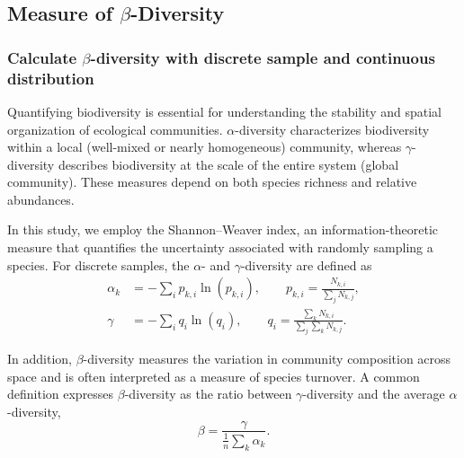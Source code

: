 \subsection{Measure of $\beta$-Diversity}

    \subsubsection*{Calculate $\beta$-diversity with discrete sample and continuous distribution}

    Quantifying biodiversity is essential for understanding the stability and spatial organization of ecological communities. $\alpha$-diversity characterizes biodiversity within a local (well-mixed or nearly homogeneous) community, whereas $\gamma$-diversity describes biodiversity at the scale of the entire system (global community). These measures depend on both species richness and relative abundances.

    In this study, we employ the Shannon--Weaver index, an information-theoretic measure that quantifies the uncertainty associated with randomly sampling a species. For discrete samples, the $\alpha$- and $\gamma$-diversity are defined as
    \begin{equation}\label{eqn:alpha_gamma_dis}
        \begin{aligned}
            \alpha_k &= -\sum_i p_{k,i} \ln(p_{k,i}), 
            \qquad p_{k,i} = \frac{N_{k,i}}{\sum_{j} N_{k,j}},\\
            \gamma &= -\sum_i q_i \ln(q_i),
            \qquad q_i = \frac{\sum_{k} N_{k,i}}{\sum_{j}\sum_{k} N_{k,j}}.
        \end{aligned}
    \end{equation}

    In addition, $\beta$-diversity measures the variation in community composition across space and is often interpreted as a measure of species turnover. A common definition expresses $\beta$-diversity as the ratio between $\gamma$-diversity and the average $\alpha$-diversity,
    \begin{equation}\label{eqn:beta_dis}
        \beta = \frac{\gamma}{\frac{1}{n} \sum_{k} \alpha_k}.
    \end{equation}

